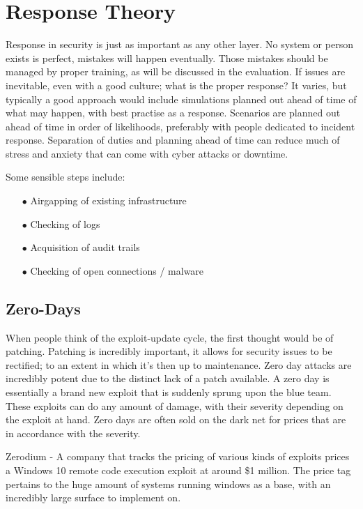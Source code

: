 
\section{Response Theory}
Response in security is just as important as any other layer. No system or person exists is perfect, mistakes will happen eventually. Those mistakes should be managed by proper training, as will be discussed in the evaluation.
If issues are inevitable, even with a good culture; what is the proper response? It varies, but typically a good approach would include simulations planned out ahead of time of what may happen, with best practise as a response.
Scenarios are planned out ahead of time in order of likelihoods, preferably with people dedicated to incident response. Separation of duties and planning ahead of time can reduce much of stress and anxiety that can come with cyber attacks or downtime.

Some sensible steps include:
\begin{enumerate}
    \item [$\bullet$] Airgapping of existing infrastructure
    \item [$\bullet$] Checking of logs
    \item [$\bullet$] Acquisition of audit trails
    \item [$\bullet$] Checking of open connections / malware
\end{enumerate}


\subsection{Zero-Days}
When people think of the exploit-update cycle, the first thought would be of patching. Patching is incredibly important, it allows for security issues to be rectified; to an extent in which it's then up to maintenance. Zero day attacks are incredibly 
potent due to the distinct lack of a patch available. A zero day is essentially a brand new exploit that is suddenly sprung upon the blue team. These exploits can do any amount of damage, with their severity depending on the exploit at hand. 
Zero days are often sold on the dark net for prices that are in accordance with the severity. 

Zerodium - A company that tracks the pricing of various kinds of exploits prices a Windows 10 remote code execution exploit at around \$1 million. 
The price tag pertains to the huge amount of systems running windows as a base, with an incredibly large surface to implement on.


